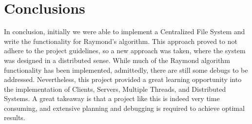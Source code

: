 \documentclass{article}
\begin{document}
\section{Conclusions}	
In conclusion, initially we were able to implement a Centralized File System and write the functionality for Raymond's algorithm. This approach proved to not adhere to the project guidelines, so a new approach was taken, where the system was designed in a distributed sense. While much of the Raymond algorithm functionality has been implemented, admittedly, there are still some debugs to be addressed. Nevertheless, this project provided a great learning opportunity into the implementation of Clients, Servers, Multiple Threads, and Distributed Systems. A great takeaway is that a project like this is indeed very time consuming, and extensive planning and debugging is required to achieve optimal results.

\end{document}
